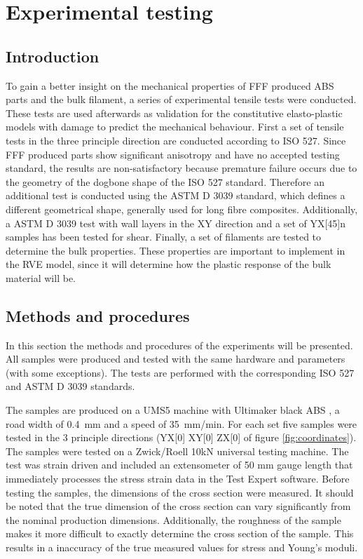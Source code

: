 \chapter{Experimental testing}
\label{chp:5}

\graphicspath{{chapter_5_Experimentaltesting/figures}}

\section{Introduction}
To gain a better insight on the mechanical properties of FFF produced ABS parts and the bulk filament, a series of experimental tensile tests were conducted. These tests are used afterwards as validation for the constitutive elasto-plastic models with damage to predict the mechanical behaviour. First a set of tensile tests in the three principle direction are conducted according to ISO 527\cite{De2013NEN-EN-ISO527-4,Afd2016NEN-EN-ISO527-2}. Since FFF produced parts show significant anisotropy and have no accepted testing standard, the results are non-satisfactory because premature failure occurs due to the geometry of the dogbone shape of the ISO 527 standard. Therefore an additional test is conducted using the ASTM D 3039 \cite{ASTM2008Standard3039} standard, which defines a different geometrical shape, generally used for long fibre composites. Additionally, a ASTM D 3039 test with wall layers in the XY direction and a set of YX[45]n samples has been tested for shear. Finally, a set of filaments are tested to determine the bulk properties. These properties are important to implement in the RVE model, since it will determine how the plastic response of the bulk material will be. 

\section{Methods and procedures}
In this section the methods and procedures of the experiments will be presented. All samples were produced and tested with the same hardware and parameters (with some exceptions). The tests are performed with the corresponding ISO 527 and ASTM D 3039 standards.

The samples are produced on a UMS5 machine with Ultimaker black ABS \cite{Ultimaker2018TechnicalABS}, a road width of 0.4~mm and a speed of 35~mm/min. For each set five samples were tested in the 3 principle directions (YX[0] XY[0] ZX[0] of figure \ref{fig:coordinates}). The samples were tested on a Zwick/Roell 10kN universal testing machine. The test was strain driven and included an extensometer of 50 mm gauge length that immediately processes the stress strain data in the Test Expert software. Before testing the samples, the dimensions of the cross section were measured. It should be noted that the true dimension of the cross section can vary significantly from the nominal production dimensions. Additionally, the roughness of the sample makes it more difficult to exactly determine the cross section of the sample. This results in a inaccuracy of the true measured values for stress and Young's moduli. 

